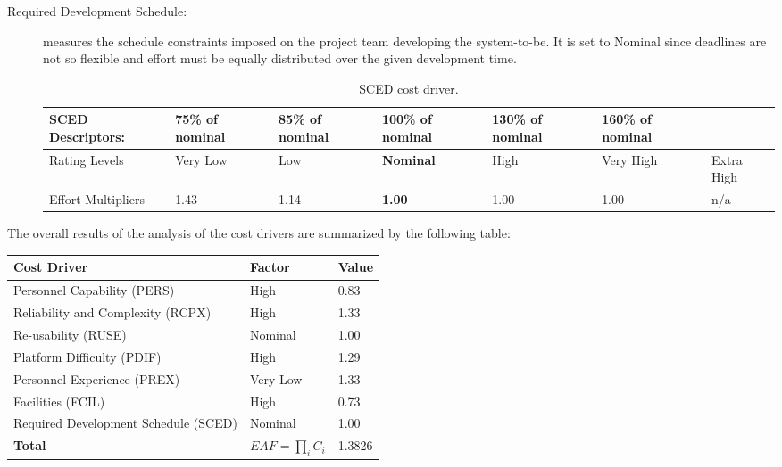 \begin{description}
\item[Required Development Schedule:] measures the schedule constraints imposed on the project team developing the system-to-be. It is set to Nominal since deadlines are not so flexible and effort must be equally distributed over the given development time.

\begin{table}[H]
	\begin{adjustwidth}{-.5in}{-.5in}
    \centering
    \begin{tabular}{p{3.6cm}|p{1.5cm}|p{1.5cm}|p{1.7cm}|p{1.5cm}|p{1.5cm}|p{1cm}}
    	\hline
        SCED Descriptors: & 75\% of nominal & 85\% of nominal & \textbf{100\% of nominal} & 130\% of nominal & 160\% of nominal & \\
        \hline
        Rating Levels & Very Low & Low & \textbf{Nominal} & High & Very High & Extra High \\
        \hline
        Effort Multipliers & 1.43 & 1.14 & \textbf{1.00} & 1.00 & 1.00 & n/a \\
        \hline
    \end{tabular}
    \caption{SCED cost driver.}
    \end{adjustwidth}
\end{table}

\end{description}

\noindent
The overall results of the analysis of the cost drivers are summarized by the following table:

\begin{table}[H]
    \centering
    \begin{tabular}{l|l|l}
    	\hline
    	Cost Driver & Factor & Value \\
        \hline
        \hline
        Personnel Capability (PERS) & High & 0.83 \\
        \hline
        Reliability and Complexity (RCPX) & High & 1.33 \\
        \hline
        Re-usability (RUSE) & Nominal & 1.00 \\
        \hline
        Platform Difficulty (PDIF) & High & 1.29 \\
        \hline
        Personnel Experience (PREX) & Very Low & 1.33 \\
        \hline
        Facilities (FCIL) & High & 0.73 \\
        \hline
        Required Development Schedule (SCED) & Nominal & 1.00 \\
        \hline
        \textbf{Total}  & $EAF=\prod_i C_i$ & 1.3826 \\
        \hline
    \end{tabular}
\end{table}

